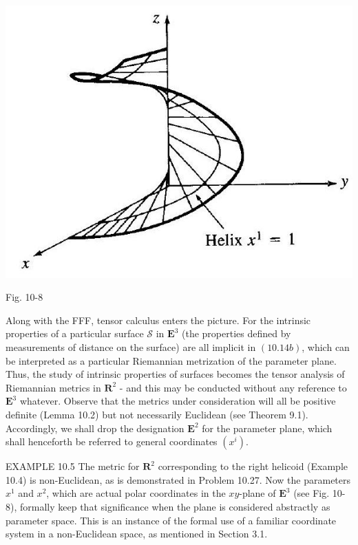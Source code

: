 \documentclass[10pt]{article}
\begin{document}
\begin{center}
\includegraphics[max width=\textwidth]{2024_04_03_41f90be4f896e21f0dc9g-143}
\end{center}

Fig. 10-8

Along with the FFF, tensor calculus enters the picture. For the intrinsic properties of a particular surface $\mathscr{S}$ in $\mathbf{E}^{3}$ (the properties defined by measurements of distance on the surface) are all implicit in $(10.14 b)$, which can be interpreted as a particular Riemannian metrization of the parameter plane. Thus, the study of intrinsic properties of surfaces becomes the tensor analysis of Riemannian metrics in $\mathbf{R}^{2}$ - and this may be conducted without any reference to $\mathbf{E}^{3}$ whatever. Observe that the metrics under consideration will all be positive definite (Lemma 10.2) but not necessarily Euclidean (see Theorem 9.1). Accordingly, we shall drop the designation $\mathbf{E}^{2}$ for the parameter plane, which shall henceforth be referred to general coordinates $\left(x^{i}\right)$.

EXAMPLE 10.5 The metric for $\mathbf{R}^{2}$ corresponding to the right helicoid (Example 10.4) is non-Euclidean, as is demonstrated in Problem 10.27. Now the parameters $x^{1}$ and $x^{2}$, which are actual polar coordinates in the $x y$-plane of $\mathbf{E}^{3}$ (see Fig. 10-8), formally keep that significance when the plane is considered abstractly as parameter space. This is an instance of the formal use of a familiar coordinate system in a non-Euclidean space, as mentioned in Section 3.1.
\end{document}
